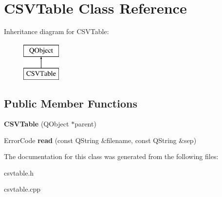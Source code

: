 \hypertarget{class_c_s_v_table}{}\section{C\+S\+V\+Table Class Reference}
\label{class_c_s_v_table}
Inheritance diagram for C\+S\+V\+Table\+:\begin{figure}[H]
\begin{center}
\leavevmode
\includegraphics[height=2.000000cm]{class_c_s_v_table}
\end{center}
\end{figure}
\subsection*{Public Member Functions}
\begin{DoxyCompactItemize}
\item 
\mbox{\label{class_c_s_v_table_aacf55dd84d5a852e2811e236dc6ab116}} 
{\bfseries C\+S\+V\+Table} (Q\+Object $\ast$parent)
\item 
\mbox{\label{class_c_s_v_table_aa869da940a741a714a1de4c828f4a947}} 
Error\+Code {\bfseries read} (const Q\+String \&filename, const Q\+String \&sep)
\end{DoxyCompactItemize}


The documentation for this class was generated from the following files\+:\begin{DoxyCompactItemize}
\item 
csvtable.\+h\item 
csvtable.\+cpp\end{DoxyCompactItemize}
